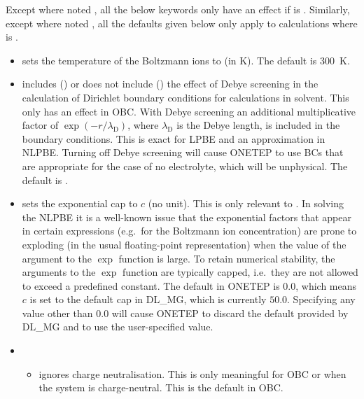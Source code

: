 \documentclass[letterpaper,10pt,english]{sphinxmanual}
\begin{document}
Except where noted \sphinxstylestrong{(*)}, all the below keywords only have an effect
if  is  . Similarly, except where noted \sphinxstylestrong{(*)},
all the defaults given below only apply to calculations where 
is  .
\begin{itemize}
\item {} 
 sets the temperature of the Boltzmann ions
to  (in K). The default is 300 K.

\item {} 
 includes () or does not
include () the effect of Debye screening in the calculation of
Dirichlet boundary conditions for calculations in solvent. This only
has an effect in OBC. With Debye screening an additional
multiplicative factor of
\(\exp{\left(-r/\lambda_{\textrm{D}}\right)}\), where
\(\lambda_{\textrm{D}}\) is the Debye length, is included in the
boundary conditions. This is exact for LPBE and an approximation in
NLPBE. Turning off Debye screening will cause ONETEP to use BCs that
are appropriate for the case of no electrolyte, which will be
unphysical. The default is .

\item {} 
 \textendash{} sets the exponential cap to \(c\) (no
unit). This is only relevant to . In solving the NLPBE
it is a well-known issue that the exponential factors that appear in
certain expressions (e.g. for the Boltzmann ion concentration) are
prone to exploding (in the usual floating-point representation) when
the value of the argument to the \(\exp\) function is large. To
retain numerical stability, the arguments to the \(\exp\)
function are typically capped, i.e. they are not allowed to exceed a
predefined constant. The default in ONETEP is \(0.0\), which
means \(c\) is set to the default cap in DL\_MG, which is
currently \(50.0\). Specifying any value other than \(0.0\)
will cause ONETEP to discard the default provided by DL\_MG and to
use the user-specified value.

\item {} 
\begin{itemize}
\item {} 
 ignores charge neutralisation. This is only meaningful
for OBC or when the system is charge-neutral. This is the default
in OBC.


\end{itemize}
\end{itemize}
\end{document}
